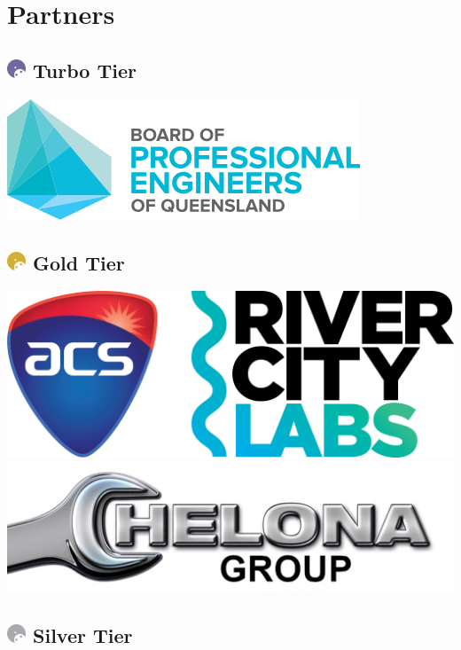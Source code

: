 \chapter{Partners}
\section{
    \includegraphics[width=1em]{../Assets/Partner Tier Icons/Turbo.png}
    \textcolor{turbo_purple}{Turbo Tier}
}
\begin{multicols}{2}
    \includegraphics[width=0.9\linewidth]{partner-logos/BPEQ-Logo-Web.png}
\end{multicols}

\section{
    \includegraphics[width=1em]{../Assets/Partner Tier Icons/Gold.png}
    \textcolor{partner_gold}{Gold Tier}
}
\begin{multicols}{2}
    \includegraphics[width=0.9\linewidth]{partner-logos/ACS-RCL_Logo-Colour.png}
    \includegraphics[width=0.9\linewidth]{partner-logos/chelona.png}
\end{multicols}

\section{
    \includegraphics[width=1em]{../Assets/Partner Tier Icons/Silver.png}
    \textcolor{partner_silver}{Silver Tier}
}
\begin{multicols}{2}
\end{multicols}